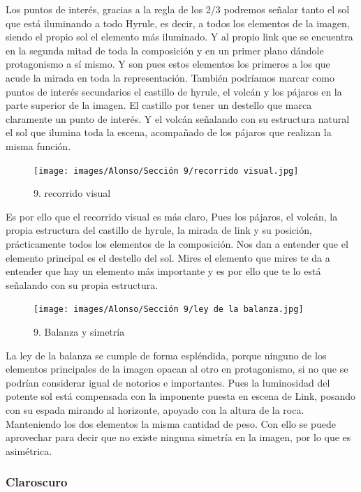 \documentclass[12pt]{article}
\begin{document}
    Los puntos de interés, gracias a la regla de los 2/3 podremos señalar tanto el sol que está iluminando a todo Hyrule, es decir, a todos los elementos de la imagen, siendo el propio sol el elemento más iluminado. Y al propio link que se encuentra en la segunda mitad de toda la composición y en un primer plano dándole protagonismo a sí mismo.
    Y son pues estos elementos los primeros a los que acude la mirada en toda la representación. También podríamos marcar como puntos de interés secundarios el castillo de hyrule, el volcán y los pájaros en la parte superior de la imagen. El castillo por tener un destello que marca claramente un punto de interés. Y el volcán señalando con su estructura natural el sol que ilumina toda la escena, acompañado de los pájaros que realizan la misma función.

    \begin{figure}[H]
      \centering
      \texttt{[image: images/Alonso/Sección 9/recorrido visual.jpg]}
      \caption{\small 9. recorrido visual}
    \end{figure}

    Es por ello que el recorrido visual es más claro, Pues los pájaros, el volcán, la propia estructura del castillo de hyrule, la mirada de link y su posición, prácticamente todos los elementos de la composición. Nos dan a entender que el elemento principal es el destello del sol. Mires el elemento que mires te da a entender que hay un elemento más importante y es por ello que te lo está señalando con su propia estructura.

    \begin{figure}[H]
      \centering
      \texttt{[image: images/Alonso/Sección 9/ley de la balanza.jpg]}
      \caption{\small 9. Balanza y simetría}
    \end{figure}

    La ley de la balanza se cumple de forma espléndida, porque ninguno de los elementos principales de la imagen opacan al otro en protagonismo, si no que se podrían considerar igual de notorios e importantes. Pues la luminosidad del potente sol está compensada con la imponente puesta en escena de Link, posando con su espada mirando al horizonte, apoyado con la altura de la roca. Manteniendo los dos elementos la misma cantidad de peso. Con ello se puede aprovechar para decir que no existe ninguna simetría en la imagen, por lo que es asimétrica.

        \subsubsection{Claroscuro}
\end{document}
